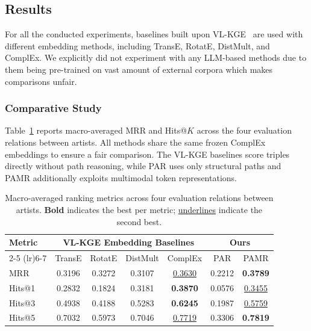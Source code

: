\documentclass[runningheads]{llncs}
\begin{document}
\subsection{Results}
\label{sec:results}

For all the conducted experiments, baselines built upon VL-KGE~\cite{efthymiou2026vlkge} are used with different embedding methods, including TransE, RotatE, DistMult, and ComplEx. We explicitly did not experiment with any LLM-based methods due to them being pre-trained on vast amount of external corpora which makes comparisons unfair.

\subsubsection{Comparative Study}

Table~\ref{tab:results} reports macro-averaged MRR and Hits@$K$ across
the four evaluation relations between artists. All methods share the same
frozen ComplEx embeddings to
ensure a fair comparison. The VL-KGE baselines score triples directly
without path reasoning, while PAR uses only structural paths and PAMR
additionally exploits multimodal token representations.

\begin{table}[t]
  \centering
  \setlength{\tabcolsep}{2pt}
  \renewcommand{\arraystretch}{1.15}
  {\footnotesize
    \begin{tabular}{l|cccc|cc}
      \toprule
      \multirow{2}{*}{Metric} &
      \multicolumn{4}{|c|}{VL-KGE Embedding Baselines} &
      \multicolumn{2}{|c|}{Ours} \\
      \cmidrule(lr){2-5} \cmidrule(lr){6-7}
      & TransE & RotatE & DistMult & ComplEx & PAR & PAMR \\
      \midrule
      MRR  & 0.3196 & 0.3272 & 0.3107 & \underline{0.3630} & 0.2212 & \textbf{0.3789} \\
      Hits@1 & 0.2832 & 0.1824 & 0.3181 & \textbf{0.3870} & 0.0576 & \underline{0.3455} \\
      Hits@3 & 0.4938 & 0.4188 & 0.5283 & \textbf{0.6245} & 0.1987 & \underline{0.5759} \\
      Hits@5 & 0.7032 & 0.5973 & 0.7046 & \underline{0.7719} & 0.3306 & \textbf{0.7819} \\
      \bottomrule
  \end{tabular}}
  \caption{Macro-averaged ranking metrics across four evaluation
    relations between artists. \textbf{Bold} indicates the best per metric;
  \underline{underlines} indicate the second best.}
  \label{tab:results}
\end{table}
\end{document}

